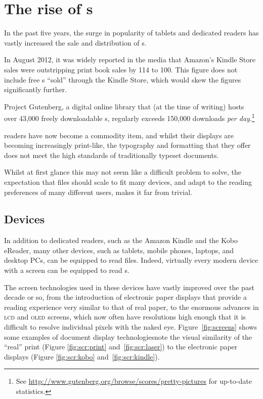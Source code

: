 \cleardoublepage
\chapter{The rise of \ebook{}s} \label{ch:intro}

In the past five years, the surge in popularity of tablets and dedicated \ebook{} readers has vastly increased the sale and distribution of \ebook{}s.

In August 2012, it was widely reported in the media that Amazon's Kindle Store sales were outstripping print book sales by 114 to 100. This figure does not include free \ebook{}s ``sold'' through the Kindle Store, which would skew the figures significantly further.

Project Gutenberg, a digital online library that (at the time of writing) hosts over 43,000 freely downloadable \ebook{}s, regularly exceeds 150,000 downloads \emph{per day}.\footnote{See \url{http://www.gutenberg.org/browse/scores/pretty-pictures} for up-to-date statistics.}

\Ebook{} readers have now become a commodity item, and whilst their displays are becoming increasingly print-like, the typography and formatting that they offer does not meet the high standards of traditionally typeset documents.

Whilst at first glance this may not seem like a difficult problem to solve, the expectation that \ebook{} files should scale to fit many devices, and adapt to the reading preferences of many different users, makes it far from trivial.

\section{Devices}

In addition to dedicated \ebook{} readers, such as the Amazon Kindle and the Kobo eReader, many other devices, such as tablets, mobile phones, laptops, and desktop PCs, can be equipped to read \ebook{} files. Indeed, virtually every modern device with a screen can be equipped to read \ebook{}s.

The screen technologies used in these devices have vastly improved over the past decade or so, from the introduction of electronic paper displays that provide a reading experience very similar to that of real paper, to the enormous advances in \textsc{lcd} and \textsc{oled} screens, which now often have resolutions high enough that it is difficult to resolve individual pixels with the naked eye. Figure~\ref{fig:screens} shows some examples of document display technologies\ed note the visual similarity of the ``real'' print (Figure \ref{fig:scr:print} and~\ref{fig:scr:laser}) to the electronic paper displays (Figure \ref{fig:scr:kobo} and~\ref{fig:scr:kindle}).

